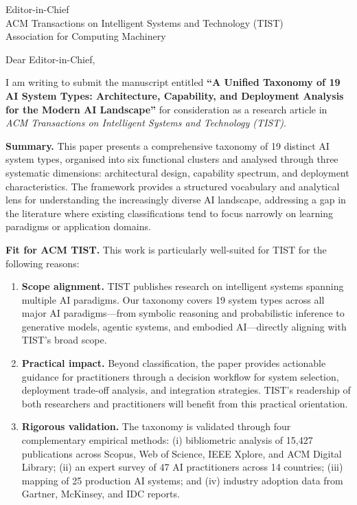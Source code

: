 \documentclass[11pt]{letter}
\begin{document}
\begin{letter}{%
  Editor-in-Chief\\
  ACM Transactions on Intelligent Systems and Technology (TIST)\\
  Association for Computing Machinery}

\opening{Dear Editor-in-Chief,}

I am writing to submit the manuscript entitled \textbf{``A Unified Taxonomy of 19 AI System Types: Architecture, Capability, and Deployment Analysis for the Modern AI Landscape''} for consideration as a research article in \textit{ACM Transactions on Intelligent Systems and Technology (TIST)}.

\textbf{Summary.} This paper presents a comprehensive taxonomy of 19 distinct AI system types, organised into six functional clusters and analysed through three systematic dimensions: architectural design, capability spectrum, and deployment characteristics. The framework provides a structured vocabulary and analytical lens for understanding the increasingly diverse AI landscape, addressing a gap in the literature where existing classifications tend to focus narrowly on learning paradigms or application domains.

\textbf{Fit for ACM TIST.} This work is particularly well-suited for TIST for the following reasons:

\begin{enumerate}
  \item \textbf{Scope alignment.} TIST publishes research on intelligent systems spanning multiple AI paradigms. Our taxonomy covers 19 system types across all major AI paradigms---from symbolic reasoning and probabilistic inference to generative models, agentic systems, and embodied AI---directly aligning with TIST's broad scope.

  \item \textbf{Practical impact.} Beyond classification, the paper provides actionable guidance for practitioners through a decision workflow for system selection, deployment trade-off analysis, and integration strategies. TIST's readership of both researchers and practitioners will benefit from this practical orientation.

  \item \textbf{Rigorous validation.} The taxonomy is validated through four complementary empirical methods: (i) bibliometric analysis of 15,427 publications across Scopus, Web of Science, IEEE Xplore, and ACM Digital Library; (ii) an expert survey of 47 AI practitioners across 14 countries; (iii) mapping of 25 production AI systems; and (iv) industry adoption data from Gartner, McKinsey, and IDC reports.


\end{enumerate}
\end{letter}
\end{document}
